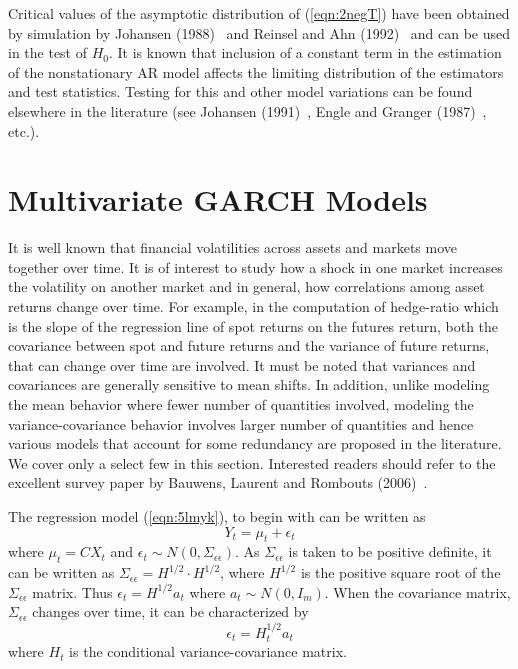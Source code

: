 Critical values of the asymptotic distribution of (\ref{eqn:2negT}) have been obtained by simulation by Johansen (1988)~\cite{johansen1988statistical} and Reinsel and Ahn (1992)~\cite{reinsel1992vector} and can be used in the test of $H_0$. It is known that inclusion of a constant term in the estimation of the nonstationary AR model affects the limiting distribution of the estimators and test statistics. Testing for this and other model variations can be found elsewhere in the literature (see Johansen (1991)~\cite{johansen1991estimation}, Engle and Granger (1987)~\cite{engle1987co}, etc.). 


\section{Multivariate GARCH Models}


It is well known that financial volatilities across assets and markets move together over time. It is of interest to study how a shock in one market increases the volatility on another market and in general, how correlations among asset returns change over time. For example, in the computation of hedge-ratio which is the slope of the regression line of spot returns on the futures return, both the covariance between spot and future returns and the variance of future returns, that can change over time are involved. It must be noted that variances and covariances are generally sensitive to mean shifts. In addition, unlike modeling the mean behavior where fewer number of quantities involved, modeling the variance-covariance behavior involves larger number of quantities and hence various models that account for some redundancy are proposed in the literature. We cover only a select few in this section. Interested readers should refer to the excellent survey paper by Bauwens, Laurent and Rombouts (2006)~\cite{laurent}.


The regression model (\ref{eqn:5lmyk}), to begin with can be written as
	\begin{equation}\label{eqn:3relabel}
	Y_t= \mu_t+\epsilon_t
	\end{equation}
where $\mu_t=CX_t$ and $\epsilon_t \sim N(0,\Sigma_{\epsilon\epsilon})$. As $\Sigma_{\epsilon\epsilon}$ is taken to be positive definite, it can be written as $\Sigma_{\epsilon\epsilon}=H^{1/2} \cdot H^{1/2}$, where $H^{1/2}$ is the positive square root of the $\Sigma_{\epsilon\epsilon}$ matrix. Thus $\epsilon_t=H^{1/2}a_t$ where $a_t \sim N(0,I_m)$. When the covariance matrix, $\Sigma_{\epsilon\epsilon}$ changes over time, it can be characterized by
	\begin{equation}
	\epsilon_t=H^{1/2}_t a_t
	\end{equation}
where $H_t$ is the conditional variance-covariance matrix.


